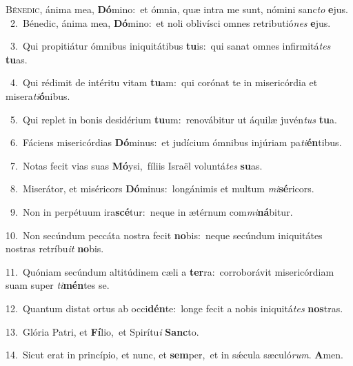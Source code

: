 \lettrine{\initial\textcolor{\initialcolor}{B}}{énedic,} ánima mea, \textbf{Dó}\-mino:~\star et ómnia, quæ intra me sunt, nómini sanc\textit{to} \textbf{e}\-jus.\\
{\numbfont\textcolor{\numbcolor}{~2.}}~Bénedic, ánima mea, \textbf{Dó}\-mino:~\star et noli oblivísci omnes retributió\textit{nes} \textbf{e}\-jus.\par
{\numbfont\textcolor{\numbcolor}{~3.}}~Qui propitiátur ómnibus iniquitátibus \textbf{tu}\-is:~\star qui sanat omnes infirmitá\textit{tes} \textbf{tu}\-as.\par
{\numbfont\textcolor{\numbcolor}{~4.}}~Qui rédimit de intéritu vitam \textbf{tu}\-am:~\star qui corónat te in misericórdia et misera\-\textit{ti}\-\textbf{ó}nibus.\par
{\numbfont\textcolor{\numbcolor}{~5.}}~Qui replet in bonis desidérium \textbf{tu}\-um:~\star renovábitur ut áquilæ juvén\textit{tus} \textbf{tu}\-a.\par
{\numbfont\textcolor{\numbcolor}{~6.}}~Fáciens misericórdias \textbf{Dó}\-minus:~\star et judícium ómnibus injúriam pa\-\textit{ti}\-\textbf{én}tibus.\par
{\numbfont\textcolor{\numbcolor}{~7.}}~Notas fecit vias suas \textbf{Mó}\-ysi,~\star fíliis Israël voluntá\textit{tes} \textbf{su}\-as.\par
{\numbfont\textcolor{\numbcolor}{~8.}}~Miserátor, et miséricors \textbf{Dó}\-minus:~\star longánimis et multum \textit{mi}\-\textbf{sé}ricors.\par
{\numbfont\textcolor{\numbcolor}{~9.}}~Non in perpétuum ira\-\textbf{scé}\-tur:~\star neque in ætérnum com\-\textit{mi}\-\textbf{ná}bitur.\par
{\numbfont\textcolor{\numbcolor}{10.}}~Non secúndum peccáta nostra fecit \textbf{no}\-bis:~\star neque secúndum iniquitátes nostras retríbu\textit{it} \textbf{no}\-bis.\par
{\numbfont\textcolor{\numbcolor}{11.}}~Quóniam secúndum altitúdinem cæli a \textbf{ter}\-ra:~\star corroborávit misericórdiam suam super \textit{ti}\-\textbf{mén}tes se.\par
{\numbfont\textcolor{\numbcolor}{12.}}~Quantum distat ortus ab occi\-\textbf{dén}\-te:~\star longe fecit a nobis iniquitá\textit{tes} \textbf{nos}\-tras.\par
{\numbfont\textcolor{\numbcolor}{13.}}~Glória Patri, et \textbf{Fí}\-lio,~\star et Spirítu\textit{i} \textbf{Sanc}\-to.\par
{\numbfont\textcolor{\numbcolor}{14.}}~Sicut erat in princípio, et nunc, et \textbf{sem}\-per,~\star et in sǽcula sæculó\-\textit{rum}\-. \textbf{A}\-men.\par
